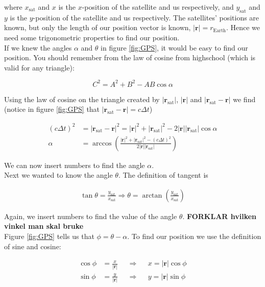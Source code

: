 \documentclass[a4paper,10pt,english]{article}
\begin{document}
\begin{enumerate}
where $x_{\text{sat}}$ and $x$ is the $x$-position of the satellite and us respectively, and $y_{\text{sat}}$ and $y$ is the $y$-position of the satellite and us respectively. The satellites' positions are known, but only the length of our position vector is known, $|\textbf{r}|=r_{\text{Earth}}$. Hence we need some trigonometric properties to find our position.
\\
If we knew the angles $\alpha$ and $\theta$ in figure \ref{fig:GPS}, it would be easy to find our position. You should remember from the law of cosine from highschool (which is valid for any triangle):

\begin{equation}
C^{2}=A^{2}+B^{2}-AB\cos{\alpha}
\end{equation}

Using the law of cosine on the triangle created by $|\textbf{r}_{\text{sat}}|$, $|\textbf{r}|$ and $|\textbf{r}_{\text{sat}}-\textbf{r}|$ we find (notice in figure \ref{fig:GPS} that $|\textbf{r}_{\text{sat}}-\textbf{r}|=c\Delta t$)

\begin{align*}
(c\Delta t)^{2}&=|\textbf{r}_{\text{sat}}-\textbf{r}|^{2}=|\textbf{r}|^{2}+|\textbf{r}_{\text{sat}}|^{2}-2|\textbf{r}||\textbf{r}_{\text{sat}}|\cos{\alpha}\\
\alpha&=\arccos{\left(\frac{|\textbf{r}|^{2}+|\textbf{r}_{\text{sat}}|^{2}-(c\Delta t)^{2}}{2|\textbf{r}||\textbf{r}_{\text{sat}}|}\right)}
\end{align*}

We can now insert numbers to find the angle $\alpha$.
\\
Next we wanted to know the angle $\theta$. The definition of tangent is

\begin{align*}
\tan{\theta}=\frac{y_{\text{sat}}}{x_{\text{sat}}} \Rightarrow \theta=\arctan{\left(\frac{y_{\text{sat}}}{x_{\text{sat}}}\right)}
\end{align*}

Again, we insert numbers to find the value of the angle $\theta$. \textbf{FORKLAR hvilken vinkel man skal bruke}
\\
Figure \ref{fig:GPS} tells us that $\phi=\theta-\alpha$. To find our position we use the definition of sine and cosine:

\begin{align*}
\cos{\phi}&=\frac{x}{|\textbf{r}|} &&\Rightarrow&& x=|\textbf{r}|\cos{\phi}\\
\sin{\phi}&=\frac{y}{|\textbf{r}|} &&\Rightarrow&& y=|\textbf{r}|\sin{\phi}
\end{align*}


\end{enumerate}
\end{document}
